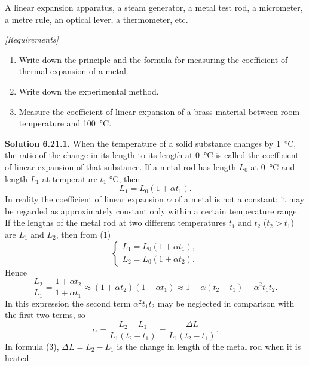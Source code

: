 A linear expansion apparatus, a steam generator, a metal test rod, a micrometer, a metre rule, an optical lever, a thermometer, etc.

\noindent\textit{[Requirements]}
\begin{enumerate}[label=(\arabic*),leftmargin=2.2em,itemsep=1pt,topsep=2pt]
\item Write down the principle and the formula for measuring the coefficient of thermal expansion of a metal.
\item Write down the experimental method.
\item Measure the coefficient of linear expansion of a brass material between room temperature and \SI{100}{\celsius}.
\end{enumerate}

\medskip
\noindent\textbf{Solution 6.21.}\quad \textbf{1.} When the temperature of a solid substance changes by \SI{1}{\celsius}, the ratio of the change in its length to its length at \SI{0}{\celsius} is called the coefficient of linear expansion of that substance. If a metal rod has length $L_0$ at \SI{0}{\celsius} and length $L_1$ at temperature $t_1$ \si{\celsius}, then
\begin{equation}\tag{1}
L_1=L_0(1+\alpha t_1).
\end{equation}
In reality the coefficient of linear expansion $\alpha$ of a metal is not a constant; it may be regarded as approximately constant only within a certain temperature range. If the lengths of the metal rod at two different temperatures $t_1$ and $t_2$ ($t_2>t_1$) are $L_1$ and $L_2$, then from (1)
\begin{equation}\tag{2}
\begin{cases}
L_1=L_0(1+\alpha t_1),\\[2pt]
L_2=L_0(1+\alpha t_2).
\end{cases}
\end{equation}
Hence
\begin{equation*}
\frac{L_2}{L_1}=\frac{1+\alpha t_2}{1+\alpha t_1}\approx(1+\alpha t_2)(1-\alpha t_1)\approx1+\alpha(t_2-t_1)-\alpha^{2}t_1t_2 .
\end{equation*}
In this expression the second term $\alpha^{2}t_1t_2$ may be neglected in comparison with the first two terms, so
\begin{equation}\tag{3}
\alpha=\frac{L_2-L_1}{L_1(t_2-t_1)}=\frac{\Delta L}{L_1(t_2-t_1)}.
\end{equation}
In formula (3), $\Delta L=L_2-L_1$ is the change in length of the metal rod when it is heated.

